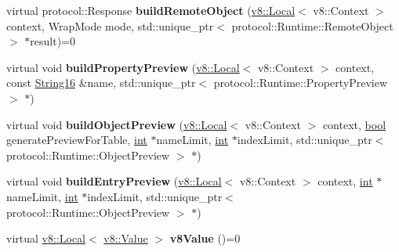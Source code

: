 \begin{DoxyCompactItemize}
\item 
\mbox{\label{classv8__inspector_1_1ValueMirror_a6b705c7524e3ecf9216bc0171fc3d411}} 
virtual protocol\+::\+Response {\bfseries build\+Remote\+Object} (\mbox{\hyperlink{classv8_1_1Local}{v8\+::\+Local}}$<$ v8\+::\+Context $>$ context, Wrap\+Mode mode, std\+::unique\+\_\+ptr$<$ protocol\+::\+Runtime\+::\+Remote\+Object $>$ $\ast$result)=0
\item 
\mbox{\label{classv8__inspector_1_1ValueMirror_a5d0da5182ea4ff747cc0622fc793d8b6}} 
virtual void {\bfseries build\+Property\+Preview} (\mbox{\hyperlink{classv8_1_1Local}{v8\+::\+Local}}$<$ v8\+::\+Context $>$ context, const \mbox{\hyperlink{classv8__inspector_1_1String16}{String16}} \&name, std\+::unique\+\_\+ptr$<$ protocol\+::\+Runtime\+::\+Property\+Preview $>$ $\ast$)
\item 
\mbox{\label{classv8__inspector_1_1ValueMirror_ad0acdfb864c8b7c50398b9b25a19c568}} 
virtual void {\bfseries build\+Object\+Preview} (\mbox{\hyperlink{classv8_1_1Local}{v8\+::\+Local}}$<$ v8\+::\+Context $>$ context, \mbox{\hyperlink{classbool}{bool}} generate\+Preview\+For\+Table, \mbox{\hyperlink{classint}{int}} $\ast$name\+Limit, \mbox{\hyperlink{classint}{int}} $\ast$index\+Limit, std\+::unique\+\_\+ptr$<$ protocol\+::\+Runtime\+::\+Object\+Preview $>$ $\ast$)
\item 
\mbox{\label{classv8__inspector_1_1ValueMirror_a631bf60e0bfe23c268395ce65a7e0eaf}} 
virtual void {\bfseries build\+Entry\+Preview} (\mbox{\hyperlink{classv8_1_1Local}{v8\+::\+Local}}$<$ v8\+::\+Context $>$ context, \mbox{\hyperlink{classint}{int}} $\ast$name\+Limit, \mbox{\hyperlink{classint}{int}} $\ast$index\+Limit, std\+::unique\+\_\+ptr$<$ protocol\+::\+Runtime\+::\+Object\+Preview $>$ $\ast$)
\item 
\mbox{\label{classv8__inspector_1_1ValueMirror_a65a7d83000476813797a16d197af8d92}} 
virtual \mbox{\hyperlink{classv8_1_1Local}{v8\+::\+Local}}$<$ \mbox{\hyperlink{classv8_1_1Value}{v8\+::\+Value}} $>$ {\bfseries v8\+Value} ()=0
\end{DoxyCompactItemize}
